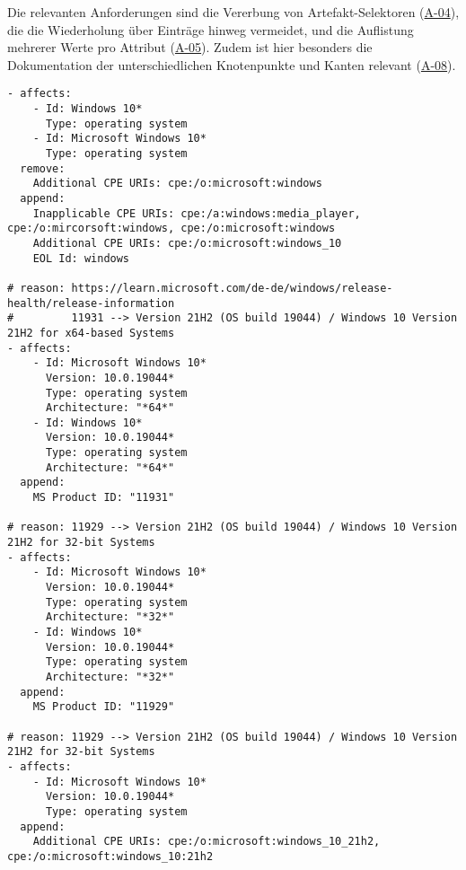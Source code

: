 Die relevanten Anforderungen sind die Vererbung von Artefakt-Selektoren (\hyperref[subsec:req-selektor-inheritance]{A-04}), die die Wiederholung über Einträge hinweg vermeidet, und die Auflistung mehrerer Werte pro Attribut (\hyperref[subsec:req-multiple-attribute-values]{A-05}).
Zudem ist hier besonders die Dokumentation der unterschiedlichen Knotenpunkte und Kanten relevant (\hyperref[subsec:req-reason-format]{A-08}).

\begin{lstlisting}[style=yaml,caption={Windows-Korrelation mit mehreren Identifikatoren},label={lst:reference-case-windows},basicstyle=\ttfamily\scriptsize]
- affects:
    - Id: Windows 10*
      Type: operating system
    - Id: Microsoft Windows 10*
      Type: operating system
  remove:
    Additional CPE URIs: cpe:/o:microsoft:windows
  append:
    Inapplicable CPE URIs: cpe:/a:windows:media_player, cpe:/o:mircorsoft:windows, cpe:/o:microsoft:windows
    Additional CPE URIs: cpe:/o:microsoft:windows_10
    EOL Id: windows

# reason: https://learn.microsoft.com/de-de/windows/release-health/release-information
#         11931 --> Version 21H2 (OS build 19044) / Windows 10 Version 21H2 for x64-based Systems
- affects:
    - Id: Microsoft Windows 10*
      Version: 10.0.19044*
      Type: operating system
      Architecture: "*64*"
    - Id: Windows 10*
      Version: 10.0.19044*
      Type: operating system
      Architecture: "*64*"
  append:
    MS Product ID: "11931"

# reason: 11929 --> Version 21H2 (OS build 19044) / Windows 10 Version 21H2 for 32-bit Systems
- affects:
    - Id: Microsoft Windows 10*
      Version: 10.0.19044*
      Type: operating system
      Architecture: "*32*"
    - Id: Windows 10*
      Version: 10.0.19044*
      Type: operating system
      Architecture: "*32*"
  append:
    MS Product ID: "11929"

# reason: 11929 --> Version 21H2 (OS build 19044) / Windows 10 Version 21H2 for 32-bit Systems
- affects:
    - Id: Microsoft Windows 10*
      Version: 10.0.19044*
      Type: operating system
  append:
    Additional CPE URIs: cpe:/o:microsoft:windows_10_21h2, cpe:/o:microsoft:windows_10:21h2
\end{lstlisting}
